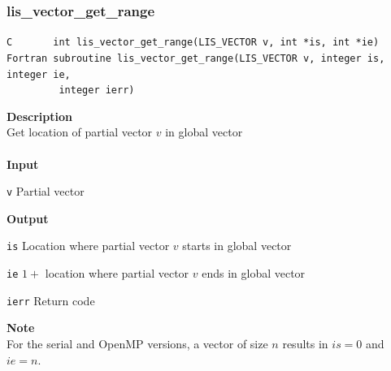 \documentclass[a4paper]{article}
\newcommand{\namelistlabel}[1]{\mbox{#1}\hfill}
\newenvironment{namelist}[1]{%
 \begin{list}{}
  {\let\makelabel\namelistlabel
  \settowidth{\labelwidth}{#1}
  \setlength{\leftmargin}{1.1\labelwidth}}
}{%
\end{list}}
\begin{document}
  \subsubsection{lis\_vector\_get\_range}
\begin{screen}
\verb|C       int lis_vector_get_range(LIS_VECTOR v, int *is, int *ie)|
\verb|Fortran subroutine lis_vector_get_range(LIS_VECTOR v, integer is, integer ie,|\\
\verb|         integer ierr) |
\end{screen}
{\bf Description}\\
\indent
Get location of partial vector $v$ in global vector 
\\ \\
\noindent
{\bf Input}
\begin{namelist}{XXXXXXXXXXXXXXXXXXXX}
\item[\tt v] Partial vector
\end{namelist}
{\bf Output}
\begin{namelist}{XXXXXXXXXXXXXXXXXXXX}
\item[\tt is] Location where partial vector $v$ starts in global vector
\item[\tt ie] $1 +$ location where partial vector $v$ ends in
	  global vector
\item[\tt ierr] Return code
\end{namelist}
{\bf Note}\\
\indent
For the serial and OpenMP versions, a vector of size $n$ results in $is = 0$ and $ie = n$. 
\end{document}
